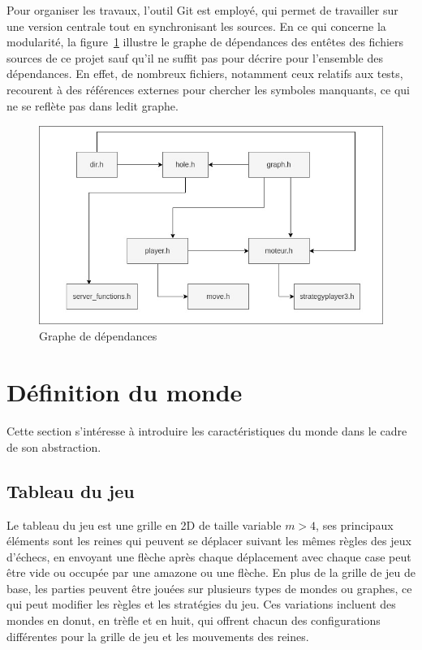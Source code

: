 \documentclass[11pt]{article}
\begin{document}
            Pour organiser les travaux, l'outil Git est employé, qui permet de travailler sur une version centrale tout en synchronisant les sources. En ce qui concerne la modularité, la figure~\ref{graphe de dépendances} illustre le graphe de dépendances des entêtes des fichiers sources de ce projet sauf qu'il ne suffit pas pour décrire pour l'ensemble des dépendances. En effet, de nombreux fichiers, notamment ceux relatifs aux tests, recourent à des références externes pour chercher les symboles manquants, ce qui ne se reflète pas dans ledit graphe.
    \begin{figure}[h]
        \centering
        \includegraphics[height = 6.5cm, width = 12.5cm]{graph_dpendances_c (4).jpg}
        \caption{Graphe de dépendances}
        \label{graphe de dépendances}
    \end{figure}
    \section{Définition du monde }
        Cette section s'intéresse à introduire les caractéristiques du monde dans le cadre de son abstraction.
        \subsection{Tableau du jeu}
        Le tableau du jeu est une grille en 2D de taille variable $m > 4$, ses principaux éléments sont les reines qui peuvent se déplacer suivant les mêmes règles des jeux d'échecs, en envoyant une flèche après chaque déplacement avec chaque case peut être vide ou occupée par une amazone ou une flèche. En plus de la grille de jeu de base, les parties peuvent être jouées sur plusieurs types de mondes ou graphes, ce qui peut modifier les règles et les stratégies du jeu. Ces variations incluent des mondes en donut, en trèfle et en huit, qui offrent chacun des configurations différentes pour la grille de jeu et les mouvements des reines. 
\end{document}
